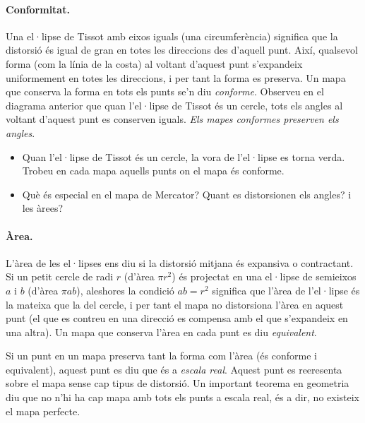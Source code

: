 \documentclass[a4paper,12pt]{article}
\begin{document}
\paragraph{Conformitat.} Una el·lipse de Tissot amb eixos iguals (una circumferència) significa que la distorsió és igual de gran en totes les direccions des d'aquell punt. Així, qualsevol forma (com la línia de la costa) al voltant d'aquest punt s'expandeix uniformement en totes les direccions, i per tant la forma es preserva. Un mapa que conserva la forma en tots els punts se'n diu \emph{conforme}. Observeu en el diagrama anterior que quan l'el·lipse de Tissot és un cercle, tots els angles al voltant d'aquest punt es conserven iguals. \emph{Els mapes conformes preserven els angles}.


\begin{itemize}
 \item Quan l'el·lipse de Tissot és un cercle, la vora de l'el·lipse es torna verda. Trobeu en cada mapa aquells  punts on el mapa és conforme. 
 \item Què és especial en el mapa de Mercator? Quant es distorsionen els angles? i les àrees?
\end{itemize}

\paragraph{Àrea.} 
L'àrea de les el·lipses ens diu si la distorsió mitjana és expansiva o contractant. Si un petit cercle de radi $r$ (d'àrea $\pi r^2$) és projectat en una el·lipse de semieixos $a$ i $b$ (d'àrea $\pi a b$), aleshores la condició $ab=r^2$ significa que l'àrea de l'el·lipse és la mateixa que la del cercle, i per tant el mapa no distorsiona l'àrea en aquest punt (el que es contreu en una direcció es compensa amb el que s'expandeix en una  altra). Un mapa que conserva l'àrea en cada punt es diu \emph{equivalent}.

Si un punt en un mapa preserva tant la forma com l'àrea (és conforme i equivalent), aquest punt es diu que és a \emph{escala real}. Aquest punt es reeresenta sobre el mapa sense cap tipus de distorsió. Un important teorema en geometria diu que no n'hi ha cap mapa amb tots els punts a escala real, és a dir, no existeix el mapa perfecte.
\end{document}
